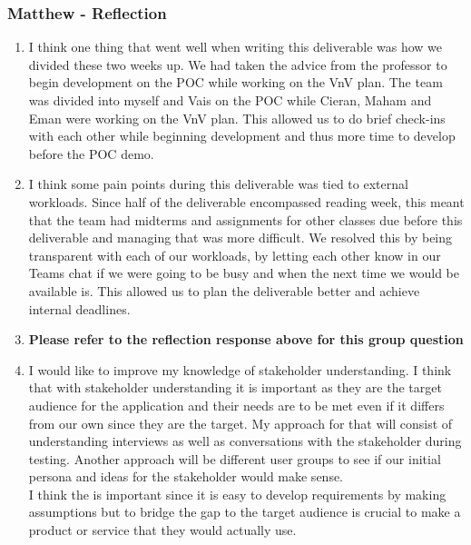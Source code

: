 \documentclass[12pt, titlepage]{article}
\begin{document}
\subsubsection*{Matthew - Reflection}
\begin{enumerate}
  \item I think one thing that went well when writing this deliverable was how we divided these two weeks up. We had taken the advice from the professor to begin development on the POC while working on the VnV plan. The team was divided into myself and Vais on the POC while Cieran, Maham and Eman were working on the VnV plan. This allowed us to do brief check-ins with each other while beginning development and thus more time to develop before the POC demo.
  \item I think some pain points during this deliverable was tied to external workloads. Since half of the deliverable encompassed reading week, this meant that the team had midterms and assignments for other classes due before this deliverable and managing that was more difficult. We resolved this by being transparent with each of our workloads, by letting each other know in our Teams chat if we were going to be busy and when the next time we would be available is. This allowed us to plan the deliverable better and achieve internal deadlines.
  \item \textbf{Please refer to the reflection response above for this group question}
  \item I would like to improve my knowledge of stakeholder understanding. I think that with stakeholder understanding it is important as they are the target audience for the application and their needs are to be met even if it differs from our own since they are the target. My approach for that will consist of understanding interviews as well as conversations with the stakeholder during testing. Another approach will be different user groups to see if our initial persona and ideas for the stakeholder would make sense. \\
  I think the is important since it is easy to develop requirements by making assumptions but to bridge the gap to the target audience is crucial to make a product or service that they would actually use.

\end{enumerate}
\end{document}
